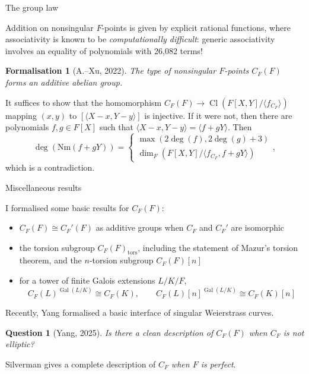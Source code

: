 \documentclass[10pt]{beamer}
\newtheorem{formalisation}{Formalisation}
\newtheorem{question}{Question}
\begin{document}
\begin{frame}[t]{The group law}

Addition on nonsingular $ F $-points is given by explicit rational functions, where associativity is known to be \emph{computationally difficult}: generic associativity involves an equality of polynomials with 26,082 terms!

\begin{formalisation}[A.--Xu, 2022]
The type of nonsingular $ F $-points $ C_F(F) $ forms an additive abelian group.
\end{formalisation}

It suffices to show that the homomorphism $ C_F(F) \to \operatorname{Cl}(F[X, Y] / \langle f_{C_F}\rangle) $ mapping $ (x, y) $ to $ [\langle X - x, Y - y \rangle] $ is injective. If it were not, then there are polynomials $ f, g \in F[X] $ such that $ \langle X - x, Y - y \rangle = \langle f + gY\rangle $. Then
$$ \deg(\mathrm{Nm}(f + gY)) =
\begin{cases}
\max(2\deg(f), 2\deg(g) + 3) \\
\dim_F(F[X, Y] / \langle f_{C_F}, f + gY\rangle)
\end{cases},
$$
which is a contradiction.

\end{frame}

\begin{frame}[t]{Miscellaneous results}

I formalised some basic results for $ C_F(F) $:
\begin{itemize}
\item $ C_F(F) \cong C_F'(F) $ as additive groups when $ C_F $ and $ C_F' $ are isomorphic
\item the torsion subgroup $ C_F(F)_{\text{tors}} $, including the statement of Mazur's torsion theorem, and the $ n $-torsion subgroup $ C_F(F)[n] $
\item for a tower of finite Galois extensions $ L / K / F $,
$$ C_F(L)^{\operatorname{Gal}(L / K)} \cong C_F(K), \qquad C_F(L)[n]^{\operatorname{Gal}(L / K)} \cong C_F(K)[n] $$
\end{itemize}

Recently, Yang formalised a basic interface of singular Weierstrass curves.

\begin{question}[Yang, 2025]
Is there a clean description of $ C_F(F) $ when $ C_F $ is not elliptic?
\end{question}

Silverman gives a complete description of $ C_F $ \emph{when $ F $ is perfect}.

\end{frame}
\end{document}
